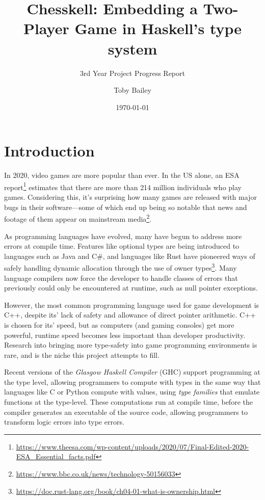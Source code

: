 \documentclass[12pt, a4paper]{scrartcl}
\title{Chesskell: Embedding a Two-Player Game in Haskell's type system}
\subtitle{3rd Year Project Progress Report}
\author{Toby Bailey}
\date{\today}
\begin{document}
\begin{titlepage}
    \maketitle
    \tableofcontents
\end{titlepage}

\section{Introduction}

In 2020, video games are more popular than ever. In the US alone, an ESA report\footnote{\url{https://www.theesa.com/wp-content/uploads/2020/07/Final-Edited-2020-ESA_Essential_facts.pdf}} estimates that there are more than 214 million individuals who play games. Considering this, it's surprising how many games are released with major bugs in their software---some of which end up being so notable that news and footage of them appear on mainstream media\footnote{\url{https://www.bbc.co.uk/news/technology-50156033}}.

As programming languages have evolved, many have begun to address more errors at compile time. Features like optional types are being introduced to languages such as Java and C\#, and languages like Rust have pioneered ways of safely handling dynamic allocation through the use of owner types\footnote{\url{https://doc.rust-lang.org/book/ch04-01-what-is-ownership.html}}. Many language compilers now force the developer to handle classes of errors that previously could only be encountered at runtime, such as null pointer exceptions.

However, the most common programming language used for game development is C++\cite{gamepp}, despite its' lack of safety and allowance of direct pointer arithmetic. C++ is chosen for its' speed, but as computers (and gaming consoles) get more powerful, runtime speed becomes less important than developer productivity. Research into bringing more type-safety into game programming environments is rare, and is the niche this project attempts to fill.

Recent versions of the \emph{Glasgow Haskell Compiler} (GHC) support programming at the type level, allowing programmers to compute with types in the same way that languages like C or Python compute with values\cite{yorgey2012giving}, using \emph{type families}\cite{opentfs}\cite{closedtfs} that emulate functions at the type-level. These computations run at compile time, before the compiler generates an executable of the source code, allowing programmers to transform logic errors into type errors\cite{twt}.
\end{document}
